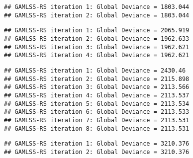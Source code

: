 \begin{verbatim}
## GAMLSS-RS iteration 1: Global Deviance = 1803.044 
## GAMLSS-RS iteration 2: Global Deviance = 1803.044
\end{verbatim}

\begin{Shaded}
\begin{Highlighting}[]
\OtherTok{\textless{}{-}} \SpecialCharTok{\textasciitilde{}} \NormalTok{, }
\end{Highlighting}
\end{Shaded}

\begin{verbatim}
## GAMLSS-RS iteration 1: Global Deviance = 2065.919 
## GAMLSS-RS iteration 2: Global Deviance = 1962.633 
## GAMLSS-RS iteration 3: Global Deviance = 1962.621 
## GAMLSS-RS iteration 4: Global Deviance = 1962.621
\end{verbatim}

\begin{Shaded}
\begin{Highlighting}[]
\OtherTok{\textless{}{-}} \SpecialCharTok{\textasciitilde{}} \NormalTok{, }
\end{Highlighting}
\end{Shaded}

\begin{verbatim}
## GAMLSS-RS iteration 1: Global Deviance = 2430.46 
## GAMLSS-RS iteration 2: Global Deviance = 2115.898 
## GAMLSS-RS iteration 3: Global Deviance = 2113.566 
## GAMLSS-RS iteration 4: Global Deviance = 2113.537 
## GAMLSS-RS iteration 5: Global Deviance = 2113.534 
## GAMLSS-RS iteration 6: Global Deviance = 2113.533 
## GAMLSS-RS iteration 7: Global Deviance = 2113.531 
## GAMLSS-RS iteration 8: Global Deviance = 2113.531
\end{verbatim}

\begin{Shaded}
\begin{Highlighting}[]
\OtherTok{\textless{}{-}} \SpecialCharTok{\textasciitilde{}} \NormalTok{, }
\end{Highlighting}
\end{Shaded}

\begin{verbatim}
## GAMLSS-RS iteration 1: Global Deviance = 3210.376 
## GAMLSS-RS iteration 2: Global Deviance = 3210.376
\end{verbatim}

